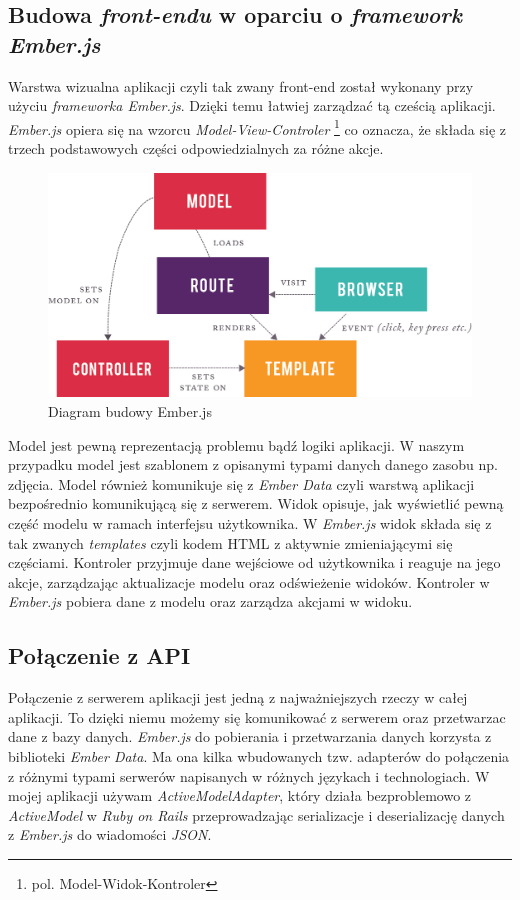 \documentclass[openright]{xmgr}
\begin{document}
\subsection{Budowa \textit{front-endu} w oparciu o \textit{framework Ember.js} }
Warstwa wizualna aplikacji czyli tak zwany front-end został wykonany przy użyciu \textit{frameworka Ember.js}. Dzięki temu łatwiej zarządzać tą cześcią aplikacji. \textit{Ember.js} opiera się na wzorcu \textit{Model-View-Controler} \footnote{pol. Model-Widok-Kontroler} co oznacza, że składa się z
trzech podstawowych części odpowiedzialnych za różne akcje. 
\begin{figure}[H]
\centering
\includegraphics[width=0.7\hsize]{images/ember.png}
\caption{Diagram budowy Ember.js\label{RYS.1}}
\end{figure}
Model  jest pewną reprezentacją problemu bądź logiki aplikacji. W naszym przypadku model jest szablonem z opisanymi typami danych danego zasobu np. zdjęcia. Model również komunikuje się z \textit{Ember Data} czyli warstwą aplikacji bezpośrednio komunikującą się z serwerem.  Widok opisuje, jak wyświetlić pewną część modelu w ramach interfejsu użytkownika. W \textit{Ember.js} widok składa się z tak zwanych \textit{templates} czyli kodem HTML z aktywnie zmieniającymi się częściami. Kontroler przyjmuje dane wejściowe od użytkownika i reaguje na jego akcje, zarządzając aktualizacje modelu oraz odświeżenie widoków. Kontroler w \textit{Ember.js} pobiera dane z modelu oraz zarządza akcjami w widoku.

\subsection{Połączenie z API}
Połączenie z serwerem aplikacji jest jedną z najważniejszych rzeczy w całej aplikacji. To dzięki niemu możemy się komunikować z serwerem oraz przetwarzac dane z bazy danych. \textit{Ember.js} do pobierania i przetwarzania danych korzysta z biblioteki \textit{Ember Data}. Ma ona kilka wbudowanych tzw. adapterów do połączenia z różnymi typami serwerów napisanych w różnych językach i technologiach. W mojej aplikacji używam \textit{ActiveModelAdapter}, który działa bezproblemowo z \textit{ActiveModel} w \textit{Ruby on Rails} przeprowadzając serializacje i deserializację danych z \textit{Ember.js} do wiadomości \textit{JSON}.
\end{document}
